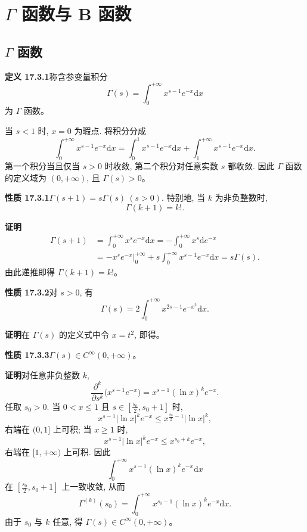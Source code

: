 \documentclass[UTF8,12pt,a4paper,fontset=fandol]{ctexart}
\begin{document}
\section{$\Gamma$ 函数与 B 函数}

\subsection{$\Gamma$ 函数}

\noindent\textbf{定义 17.3.1}\quad 称含参变量积分
\[
  \Gamma(s)=\int_0^{+\infty}x^{s-1}e^{-x}\mathrm dx
\]
为 $\Gamma$ 函数。

当 $s<1$ 时, $x=0$ 为瑕点. 将积分分成
\[
  \int_0^{+\infty}x^{s-1}e^{-x}\mathrm dx
  =
  \int_0^1x^{s-1}e^{-x}\mathrm dx+\int_1^{+\infty}x^{s-1}e^{-x}\mathrm dx.
\]
第一个积分当且仅当 $s>0$ 时收敛, 第二个积分对任意实数 $s$ 都收敛. 因此 $\Gamma$ 函数的定义域为 $(0,+\infty)$, 且 $\Gamma(s)>0$。

\noindent\textbf{性质 17.3.1}\quad $\Gamma(s+1)=s\Gamma(s)\ (s>0)$. 特别地, 当 $k$ 为非负整数时,
\[
  \Gamma(k+1)=k!.
\]

\noindent\textbf{证明}\quad
\[
\begin{aligned}
  \Gamma(s+1)
  &=\int_0^{+\infty}x^s e^{-x}\mathrm dx
  =-\int_0^{+\infty}x^s\mathrm d e^{-x}\\
  &=-x^s e^{-x}\Big|_0^{+\infty}
  +s\int_0^{+\infty}x^{s-1}e^{-x}\mathrm dx
  =s\Gamma(s).
\end{aligned}
\]
由此递推即得 $\Gamma(k+1)=k!$。

\noindent\textbf{性质 17.3.2}\quad 对 $s>0$, 有
\[
  \Gamma(s)=2\int_0^{+\infty}x^{2s-1}e^{-x^2}\mathrm dx.
\]

\noindent\textbf{证明}\quad 在 $\Gamma(s)$ 的定义式中令 $x=t^2$, 即得。

\noindent\textbf{性质 17.3.3}\quad $\Gamma(s)\in C^\infty(0,+\infty)$。

\noindent\textbf{证明}\quad 对任意非负整数 $k$,
\[
  \frac{\partial^k}{\partial s^k}\bigl(x^{s-1}e^{-x}\bigr)
  =x^{s-1}(\ln x)^k e^{-x}.
\]
任取 $s_0>0$. 当 $0<x\leqslant1$ 且 $s\in[\frac{s_0}2,s_0+1]$ 时,
\[
  x^{s-1}|\ln x|^k e^{-x}\leqslant x^{\frac{s_0}2-1}|\ln x|^k,
\]
右端在 $(0,1]$ 上可积; 当 $x\geqslant1$ 时,
\[
  x^{s-1}|\ln x|^k e^{-x}\leqslant x^{s_0+k}e^{-x},
\]
右端在 $[1,+\infty)$ 上可积. 因此
\[
  \int_0^{+\infty}x^{s-1}(\ln x)^k e^{-x}\mathrm dx
\]
在 $[\frac{s_0}2,s_0+1]$ 上一致收敛, 从而
\[
  \Gamma^{(k)}(s_0)=\int_0^{+\infty}x^{s_0-1}(\ln x)^k e^{-x}\mathrm dx.
\]
由于 $s_0$ 与 $k$ 任意, 得 $\Gamma(s)\in C^\infty(0,+\infty)$。
\end{document}
